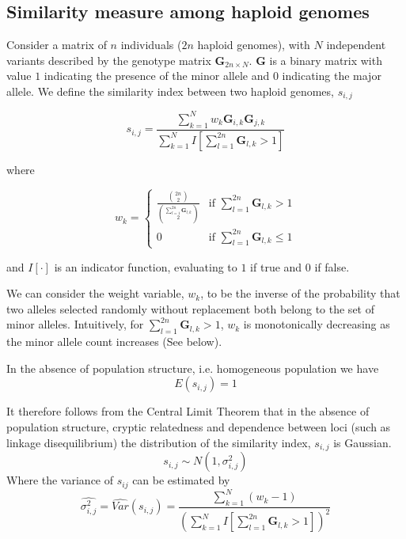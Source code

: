 \subsection{Similarity measure among haploid genomes}

Consider a matrix of $n$ individuals ($2n$ haploid genomes), with
$N$ independent variants described by the genotype matrix $\mathbf{G}_{2n\times N}$.
$\mathbf{G}$ is a binary matrix with value $1$ indicating the presence
of the minor allele and $0$ indicating the major allele. We define
the similarity index between two haploid genomes, $s_{i,j}$

\begin{equation}
s_{i,j}=\frac{\sum_{k=1}^{N}w_{k}\mathbf{G}_{i,k}\mathbf{G}_{j,k}}{\sum_{k=1}^{N}I\left[\sum_{l=1}^{2n}\mathbf{G}_{l,k}>1\right]}\label{eq:s equation}
\end{equation}

where 

\[
w_{k}=\begin{cases}
\frac{{2n \choose 2}}{{\sum_{l=1}^{2n}\mathbf{G}_{l,k} \choose 2}} & \text{if } \sum_{l=1}^{2n}\mathbf{G}_{l,k}>1\\
0 & \text{if } \sum_{l=1}^{2n}\mathbf{G}_{l,k}\le1
\end{cases}
\]

and $I[\cdot]$ is an indicator function, evaluating to $1$ if true and $0$ if false.

We can consider the weight variable, $w_k$, to be the inverse of the probability that two alleles selected randomly without replacement both belong to the set of minor alleles.  Intuitively, for $\sum_{l=1}^{2n}\mathbf{G}_{l,k}>1$, $w_k$ is monotonically decreasing as the minor allele count increases (See below).

In the absence of population structure, i.e. homogeneous population
we have
\begin{equation}
E\left(s_{i,j}\right)=1
\label{eq:expectation_equation}
\end{equation}

It therefore follows from the Central Limit Theorem that in the absence
of population structure, cryptic relatedness and dependence between
loci (such as linkage disequilibrium) the distribution of the similarity
index, $s_{i,j}$ is Gaussian.
\[
s_{i,j}\sim N\left(1,\sigma_{i,j}^{2}\right)
\]
Where the variance of $s_{ij}$ can be estimated by 
\begin{equation}
\hat{\sigma_{i,j}^{2}}=\hat{Var}\left(s_{i,j}\right)=\frac{\sum_{k=1}^{N}\left(w_{k}-1\right)}{\left(\sum_{k=1}^{N}I\left[\sum_{l=1}^{2n}\mathbf{G}_{l,k}>1\right]\right)^{2}}
\label{eq:variance_equation}
\end{equation}


